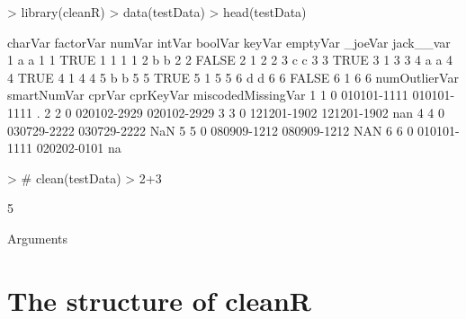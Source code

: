 \documentclass[article]{jss}
\begin{document}
\begin{Schunk}
\begin{Sinput}
> library(cleanR)
> data(testData)
> head(testData)
\end{Sinput}
\begin{Soutput}
  charVar factorVar numVar intVar boolVar keyVar emptyVar _joeVar jack__var
1       a         a      1      1    TRUE      1        1       1         1
2       b         b      2      2   FALSE      2        1       2         2
3       c         c      3      3    TRUE      3        1       3         3
4       a         a      4      4    TRUE      4        1       4         4
5       b         b      5      5    TRUE      5        1       5         5
6       d         d      6      6   FALSE      6        1       6         6
  numOutlierVar smartNumVar      cprVar   cprKeyVar miscodedMissingVar
1             1           0 010101-1111 010101-1111                  .
2             2           0 020102-2929 020102-2929                   
3             3           0 121201-1902 121201-1902                nan
4             4           0 030729-2222 030729-2222                NaN
5             5           0 080909-1212 080909-1212                NAN
6             6           0 010101-1111 020202-0101                 na
\end{Soutput}
\end{Schunk}


\begin{Schunk}
\begin{Sinput}
>                                         # clean(testData)
> 2+3
\end{Sinput}
\begin{Soutput}
[1] 5
\end{Soutput}
\end{Schunk}


% 

Arguments


\section{The structure of cleanR} \label{sec:internals}
\end{document}
